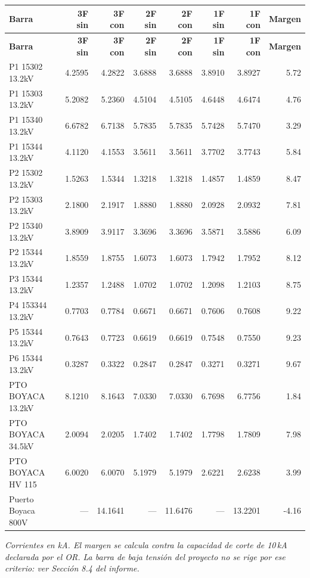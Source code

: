 \documentclass[11pt,a4paper]{article}
\begin{document}
\small
\begin{longtable}{lrrrrrrr}
\toprule
\textbf{Barra} & \textbf{3F sin} & \textbf{3F con} & \textbf{2F sin} & \textbf{2F con} & \textbf{1F sin} & \textbf{1F con} & \textbf{Margen} \\
\midrule
\endfirsthead
\toprule
\textbf{Barra} & \textbf{3F sin} & \textbf{3F con} & \textbf{2F sin} & \textbf{2F con} & \textbf{1F sin} & \textbf{1F con} & \textbf{Margen} \\
\midrule
\endhead
\bottomrule
\endfoot
P1 15302 13.2kV & 4.2595 & 4.2822 & 3.6888 & 3.6888 & 3.8910 & 3.8927 & 5.72 \\
P1 15303 13.2kV & 5.2082 & 5.2360 & 4.5104 & 4.5105 & 4.6448 & 4.6474 & 4.76 \\
P1 15340 13.2kV & 6.6782 & 6.7138 & 5.7835 & 5.7835 & 5.7428 & 5.7470 & 3.29 \\
P1 15344 13.2kV & 4.1120 & 4.1553 & 3.5611 & 3.5611 & 3.7702 & 3.7743 & 5.84 \\
P2 15302 13.2kV & 1.5263 & 1.5344 & 1.3218 & 1.3218 & 1.4857 & 1.4859 & 8.47 \\
P2 15303 13.2kV & 2.1800 & 2.1917 & 1.8880 & 1.8880 & 2.0928 & 2.0932 & 7.81 \\
P2 15340 13.2kV & 3.8909 & 3.9117 & 3.3696 & 3.3696 & 3.5871 & 3.5886 & 6.09 \\
P2 15344 13.2kV & 1.8559 & 1.8755 & 1.6073 & 1.6073 & 1.7942 & 1.7952 & 8.12 \\
P3 15344 13.2kV & 1.2357 & 1.2488 & 1.0702 & 1.0702 & 1.2098 & 1.2103 & 8.75 \\
P4 153344 13.2kV & 0.7703 & 0.7784 & 0.6671 & 0.6671 & 0.7606 & 0.7608 & 9.22 \\
P5 15344 13.2kV & 0.7643 & 0.7723 & 0.6619 & 0.6619 & 0.7548 & 0.7550 & 9.23 \\
P6 15344 13.2kV & 0.3287 & 0.3322 & 0.2847 & 0.2847 & 0.3271 & 0.3271 & 9.67 \\
PTO BOYACA 13.2kV & 8.1210 & 8.1643 & 7.0330 & 7.0330 & 6.7698 & 6.7756 & 1.84 \\
PTO BOYACA 34.5kV & 2.0094 & 2.0205 & 1.7402 & 1.7402 & 1.7798 & 1.7809 & 7.98 \\
PTO BOYACA HV 115 & 6.0020 & 6.0070 & 5.1979 & 5.1979 & 2.6221 & 2.6238 & 3.99 \\
Puerto Boyaca 800V & --- & 14.1641 & --- & 11.6476 & --- & 13.2201 & -4.16 \\
\end{longtable}
\vspace{-0.5em}
{\small\itshape Corrientes en kA. El margen se calcula contra la capacidad de corte de 10\,kA declarada por el OR. La barra de baja tensi\'on del proyecto no se rige por ese criterio: ver Secci\'on 8.4 del informe.}
\end{document}
